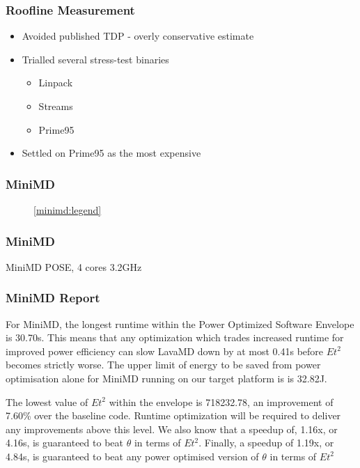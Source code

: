 \documentclass{beamer}
\begin{document}
  \begin{frame}
    \frametitle{Roofline Measurement}
    \begin{itemize}
      \item Avoided published TDP - overly conservative estimate
      \item Trialled several stress-test binaries
      \begin{itemize}
        \item Linpack
        \item Streams
        \item Prime95
      \end{itemize}
      \item Settled on Prime95 as the most expensive
    \end{itemize}
  \end{frame}

  \begin{frame}
    \frametitle{MiniMD}
    \begin{figure}
    \centering
    
    \ref{minimd:legend}
    \end{figure}
  \end{frame}
  \begin{frame}
    \frametitle{MiniMD}
    \begin{table}
    
    \caption{MiniMD POSE, 4 cores 3.2GHz}
    \end{table} 
  \end{frame}

  \begin{frame}
    \frametitle{MiniMD Report}
    For MiniMD, the longest runtime within the Power Optimized Software Envelope is 30.70s.
    This means that any optimization which trades increased runtime for improved power efficiency can slow LavaMD down by at most 0.41s before $Et^2$ becomes strictly worse.
    The upper limit of energy to be saved from power optimisation alone for MiniMD running on our target platform is is 32.82J.

    The lowest value of $Et^2$ within the envelope is 718232.78, an improvement of 7.60\% over the baseline code. 
    Runtime optimization will be required to deliver any improvements above this level.
    We also know that a speedup of, 1.16x, or 4.16s, is guaranteed to beat $\theta$ in terms of $Et^2$.
    Finally, a speedup of 1.19x, or 4.84s, is guaranteed to beat any power optimised version of $\theta$ in terms of $Et^2$
  \end{frame}
\end{document}
